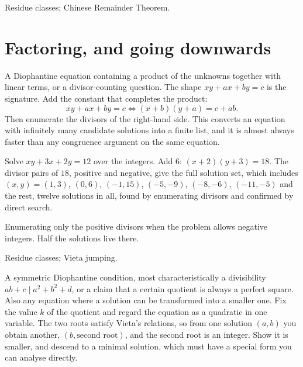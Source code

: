 \begin{seealsob}Residue classes; Chinese Remainder Theorem.\end{seealsob}

\section{Factoring, and going downwards}

\cue A Diophantine equation containing a product of the unknowns together with linear terms, or a divisor-counting question. The shape $xy+ax+by=c$ is the signature.
\method Add the constant that completes the product:
\[
xy+ax+by=c \iff (x+b)(y+a)=c+ab.
\]
Then enumerate the divisors of the right-hand side. This converts an equation with infinitely many candidate solutions into a finite list, and it is almost always faster than any congruence argument on the same equation.

\begin{worked}
Solve $xy+3x+2y=12$ over the integers. Add $6$: $(x+2)(y+3)=18$. The divisor pairs of $18$, positive and negative, give the full solution set, which includes $(x,y)=(1,3)$, $(0,6)$, $(-1,15)$, $(-5,-9)$, $(-8,-6)$, $(-11,-5)$ and the rest, twelve solutions in all, found by enumerating divisors and confirmed by direct search.
\end{worked}

\begin{trap}
Enumerating only the positive divisors when the problem allows negative integers. Half the solutions live there.
\end{trap}

\begin{seealsob}Residue classes; Vieta jumping.\end{seealsob}

\cue A symmetric Diophantine condition, most characteristically a divisibility $ab+c\mid a^{2}+b^{2}+d$, or a claim that a certain quotient is always a perfect square. Also any equation where a solution can be transformed into a smaller one.
\method Fix the value $k$ of the quotient and regard the equation as a quadratic in one variable. The two roots satisfy Vieta's relations, so from one solution $(a,b)$ you obtain another, $(b, \text{second root})$, and the second root is an integer. Show it is smaller, and descend to a minimal solution, which must have a special form you can analyse directly.

